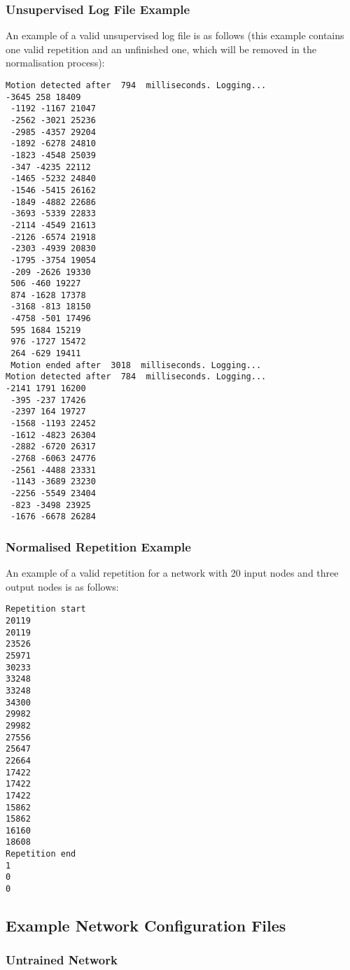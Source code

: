 \documentclass[a4paper]{article}
\begin{document}
\newpage
\subsubsection{Unsupervised Log File Example}
\label{subsubsec:a2_lf_unsupervised}

An example of a valid unsupervised log file is as follows (this example contains one valid repetition and an unfinished one, which will be removed in the normalisation process):

\begin{lstlisting}
Motion detected after  794  milliseconds. Logging...
-3645 258 18409
 -1192 -1167 21047
 -2562 -3021 25236
 -2985 -4357 29204
 -1892 -6278 24810
 -1823 -4548 25039
 -347 -4235 22112
 -1465 -5232 24840
 -1546 -5415 26162
 -1849 -4882 22686
 -3693 -5339 22833
 -2114 -4549 21613
 -2126 -6574 21918
 -2303 -4939 20830
 -1795 -3754 19054
 -209 -2626 19330
 506 -460 19227
 874 -1628 17378
 -3168 -813 18150
 -4758 -501 17496
 595 1684 15219
 976 -1727 15472
 264 -629 19411
 Motion ended after  3018  milliseconds. Logging...
Motion detected after  784  milliseconds. Logging...
-2141 1791 16200
 -395 -237 17426
 -2397 164 19727
 -1568 -1193 22452
 -1612 -4823 26304
 -2882 -6720 26317
 -2768 -6063 24776
 -2561 -4488 23331
 -1143 -3689 23230
 -2256 -5549 23404
 -823 -3498 23925
 -1676 -6678 26284
\end{lstlisting}

\newpage
\subsubsection{Normalised Repetition Example}%
\label{subsubsec:a2_lf_normalised}

An example of a valid repetition for a network with 20 input nodes and three output nodes is as follows:

\begin{lstlisting}
Repetition start
20119
20119
23526
25971
30233
33248
33248
34300
29982
29982
27556
25647
22664
17422
17422
17422
15862
15862
16160
18608
Repetition end
1
0
0
\end{lstlisting}

\newpage
\subsection{Example Network Configuration Files}%
\label{subsec:a2_configfiles}

\subsubsection{Untrained Network}
\end{document}

